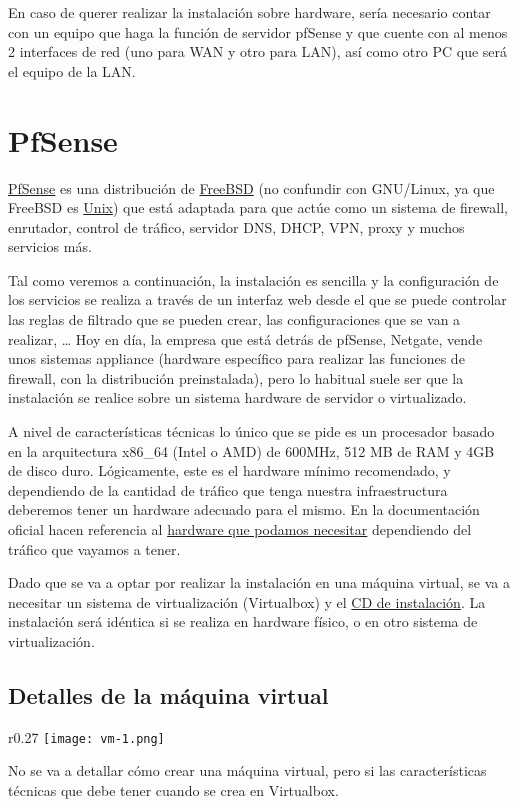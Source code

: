 En caso de querer realizar la instalación sobre hardware, sería necesario contar con un equipo que haga la función de servidor pfSense y que cuente con al menos 2 interfaces de red (uno para WAN y otro para LAN), así como otro PC que será el equipo de la LAN.


\chapter{PfSense}
\href{https://www.pfsense.org/}{PfSense} es una distribución de \href{https://es.wikipedia.org/wiki/FreeBSD}{FreeBSD} (no confundir con GNU/Linux, ya que FreeBSD es \href{https://es.wikipedia.org/wiki/Unix}{Unix}) que está adaptada para que actúe como un sistema de firewall, enrutador, control de tráfico, servidor DNS, DHCP, VPN, proxy y muchos servicios más.

Tal como veremos a continuación, la instalación es sencilla y la configuración de los servicios se realiza a través de un interfaz web desde el que se puede controlar las reglas de filtrado que se pueden crear, las configuraciones que se van a realizar, …
Hoy en día, la empresa que está detrás de pfSense, Netgate, vende unos sistemas appliance (hardware específico para realizar las funciones de firewall, con la distribución preinstalada), pero lo habitual suele ser que la instalación se realice sobre un sistema hardware de servidor o virtualizado.

A nivel de características técnicas lo único que se pide es un procesador basado en la arquitectura x86\_64 (Intel o AMD) de 600MHz, 512 MB de RAM y 4GB de disco duro. Lógicamente, este es el hardware mínimo recomendado, y dependiendo de la cantidad de tráfico que tenga nuestra infraestructura deberemos tener un hardware adecuado para el mismo. En la documentación oficial hacen referencia al \href{https://docs.netgate.com/pfsense/en/latest/hardware/size.html}{hardware que podamos necesitar} dependiendo del tráfico que vayamos a tener.

Dado que se va a optar por realizar la instalación en una máquina virtual, se va a necesitar un sistema de virtualización (Virtualbox) y el \href{https://www.pfsense.org/download/}{CD de instalación}. La instalación será idéntica si se realiza en hardware físico, o en otro sistema de virtualización.

\hypertarget{detalles_maquina_virtual}{}
\section{Detalles de la máquina virtual}
\begin{wrapfigure}{r}{0.27\linewidth}
    \centering
    \vspace{-20pt}
    \texttt{[image: vm-1.png]}
\end{wrapfigure}
No se va a detallar cómo crear una máquina virtual, pero si las características técnicas que debe tener cuando se crea en Virtualbox.

